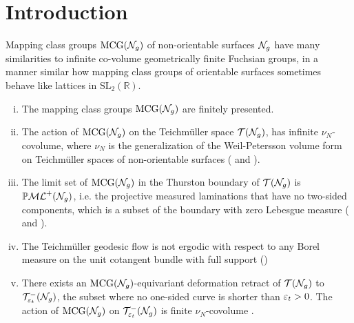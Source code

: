 \section{Introduction}
\label{sec:introduction}


Mapping class groups $\mathrm{MCG}(\mathcal{N}_g)$ of non-orientable surfaces $\mathcal{N}_g$ have many similarities to infinite co-volume geometrically finite Fuchsian groups, in a manner similar how mapping class groups of orientable surfaces sometimes behave like lattices in $\mathrm{SL}_2(\mathbb{R})$.

\begin{enumerate}[(i)]
\item The mapping class groups $\mathrm{MCG}(\mathcal{N}_g)$ are finitely presented.
\item The action of $\mathrm{MCG}(\mathcal{N}_g)$ on the Teichmüller space $\mathcal{T}(\mathcal{N}_g)$, has infinite $\nu_N$-covolume, where $\nu_N$ is the generalization of the Weil-Petersson volume form on Teichmüller spaces of non-orientable surfaces (\cite[Theorem 17.1]{gendulphe2017whats} and \cite{norbury2008lengths}).
\item The limit set of $\mathrm{MCG}(\mathcal{N}_g)$ in the Thurston boundary of $\mathcal{T}(\mathcal{N}_g)$ is $\mathbb{P}\mathcal{ML}^+(\mathcal{N}_g)$, i.e. the projective measured laminations that have no two-sided components, which is a subset of the boundary with zero Lebesgue measure (\cite{erlandsson2023mapping} and \cite{limitsetkhan}).
\item The Teichmüller geodesic flow is not ergodic with respect to any Borel measure on the unit cotangent bundle with full support (\cite[Proposition 17.5]{gendulphe2017whats})
\item There exists an $\mathrm{MCG}(\mathcal{N}_g)$-equivariant deformation retract of $\mathcal{T}(\mathcal{N}_g)$ to $\mathcal{T}_{\varepsilon_t}^{-}(\mathcal{N}_g)$, the subset where no one-sided curve is shorter than $\varepsilon_t > 0$. The action of $\mathrm{MCG}(\mathcal{N}_g)$ on $\mathcal{T}_{\varepsilon_t}^{-}(\mathcal{N}_g)$ is finite $\nu_N$-covolume \cite[Proposition 19.1]{gendulphe2017whats}.
\end{enumerate}

